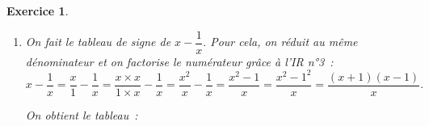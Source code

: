 \documentclass[10pt]{article}
\newtheorem{exo}{Exercice}
\begin{document}
\begin{exo}
\begin{enumerate}
\medskip

Pour terminer, on remarque que partout ailleurs (donc là où ce n'est ni égal à $0,$ ni strictement négatif), $|x|-3$ est strictement positif. On a donc le tableau~:

\medskip

\begin{center}
\end{center}




\item On fait le tableau de signe de $x-\dfrac{1}{x}.$ Pour cela, on réduit au même dénominateur et on factorise le numérateur grâce à l'IR n°3~:
\[x-\frac{1}{x}=\frac{x}{1}-\frac{1}{x}=\frac{x\times x}{1\times x}-\frac{1}{x}=\frac{x^2}{x}-\frac{1}{x}=\frac{x^2-1}{x}=\frac{x^2-1^2}{x}=\frac{(x+1)(x-1)}{x}.\]

On obtient le tableau~:

\medskip

\begin{center}
\end{center}
\end{enumerate}
\end{exo}
\end{document}
